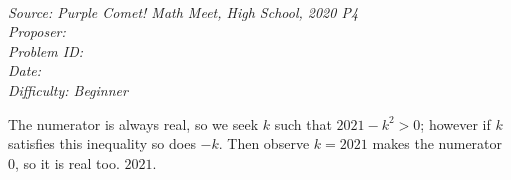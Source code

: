 \SSbreak\\
\emph{Source: Purple Comet! Math Meet, High School, 2020 P4}\\
\emph{Proposer: \Pnjoy}\\ %
\emph{Problem ID:}\\
\emph{Date: }\\
\emph{Difficulty: Beginner}\\
\SSbreak

\bigskip

\begin{solution}\hfil\medskip
	
	The numerator is always real, so we seek $k$ such that $2021 - k^2 > 0$; however if $k$ satisfies this inequality so does $-k$. Then observe
	$k = 2021$ makes the numerator 0, so it is real too. $\boxed{2021}$.
\end{solution}\bigskip
